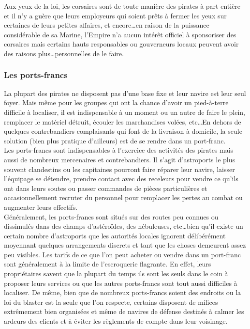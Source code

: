 \documentclass[twoside]{article}
\begin{document}
Aux yeux de la loi, les corsaires sont de toute manière des pirates à part entière et il n'y a guère que leurs employeurs qui soient prêts à fermer les yeux sur certaines de leurs petites affaires, et encore\ldots en raison de la puissance considérable de sa Marine, l'Empire n'a aucun intérêt officiel à sponsoriser des corsaires mais certains hauts responsables ou gouverneurs locaux peuvent avoir des raisons plus\ldots personnelles de le faire.

\subsubsection{Les ports-francs}
La plupart des pirates ne disposent pas d'une base fixe et leur navire est leur seul foyer. Mais même pour les groupes qui ont la chance d'avoir un pied-à-terre difficile à localiser, il est indispensable à un moment ou un autre de faire le plein, remplacer le matériel détruit, écouler les marchandises volées, etc\ldots En dehors de quelques contrebandiers complaisants qui font de la livraison à domicile, la seule solution (bien plus pratique d'ailleurs) est de se rendre dans un port-franc.\\

Les ports-francs sont indispensables à l'exercice des activités des pirates mais aussi de nombreux mercenaires et contrebandiers. Il s'agit d'astroports le plus souvent clandestins ou les capitaines pourront faire réparer leur navire, laisser l'équipage se détendre, prendre contact avec des receleurs pour vendre ce qu'ils ont dans leurs soutes ou passer commandes de pièces particulières et occasionnellement recruter du personnel pour remplacer les pertes au combat ou augmenter leurs effectifs.\\

Généralement, les ports-francs sont situés sur des routes peu connues ou dissimulés dans des champs d'astéroïdes, des nébuleuses, etc\ldots bien qu'il existe un certain nombre d'astroports que les autorités locales ignorent délibérément moyennant quelques arrangements discrets et tant que les choses demeurent assez peu visibles. Les tarifs de ce que l'on peut acheter ou vendre dans un port-franc sont généralement à la limite de l'escroquerie flagrante. En effet, leurs propriétaires savent que la plupart du temps ils sont les seuls dans le coin à proposer leurs services ou que les autres ports-francs sont tout aussi difficiles à localiser. De même, bien que de nombreux ports-francs soient des endroits ou la loi du blaster est la seule que l'on respecte, certains disposent de milices extrêmement bien organisées et même de navires de défense destinés à calmer les ardeurs des clients et à éviter les règlements de compte dans leur voisinage.
\end{document}
